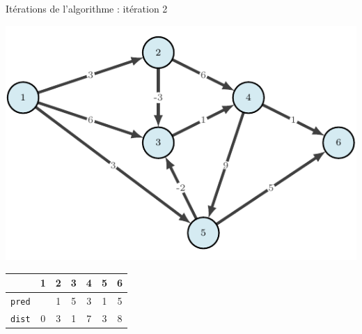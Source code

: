 \begin{frame}{Itérations de l'algorithme : itération 2}
    \begin{center}
        \includegraphics[height=.6\textheight]{fig/bellman-0.pdf}      
    \begin{tabular}{c|cccccc}
      
        & 1    &2      &3      &4      &5      &6      \\
        \hline
        \texttt{pred} & &1      &5      &3      &1      &5           \\
        \texttt{dist} & 0       &3      &1      &7      &3      &8      \\
        
    \end{tabular}
\end{center}
\end{frame}

